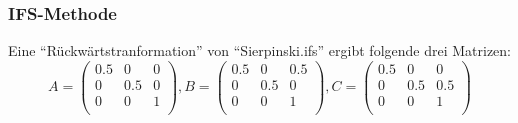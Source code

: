 \documentclass[]{article}
\begin{document}
\subsubsection*{IFS-Methode}
Eine "`Rückwärtstranformation"' von "`Sierpinski.ifs"' ergibt folgende drei Matrizen:
 \[  
 A = 
 \begin{pmatrix}
 0.5 & 0 & 0 \\
 0 & 0.5 & 0 \\
 0 & 0 & 1 \\
 \end{pmatrix}
 ,
 B = 
 \begin{pmatrix}
 0.5 & 0 & 0.5 \\
 0 & 0.5 & 0 \\
 0 & 0 & 1 \\
 \end{pmatrix}
,
 C = 
 \begin{pmatrix}
 0.5 & 0 & 0 \\
 0 & 0.5 & 0.5 \\
 0 & 0 & 1 \\
 \end{pmatrix}
 \] 
 
\end{document}
